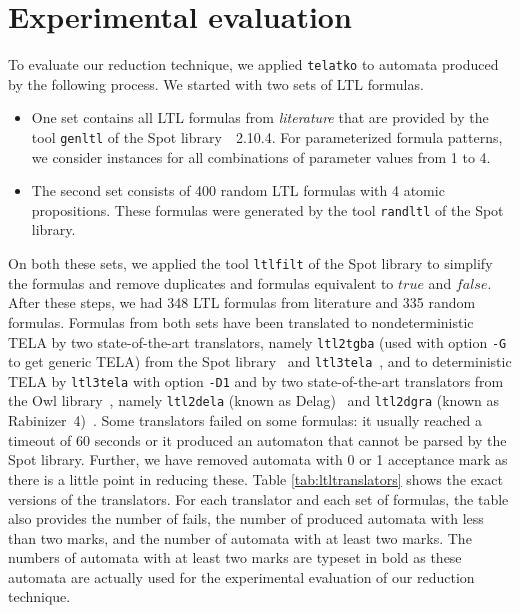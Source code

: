\documentclass[a4paper,UKenglish,cleveref,autoref,thm-restate]{lipics-v2021}
\def\false{\mathit{false}}
\def\true{\mathit{true}}
\newcommand{\telatko}{\texttt{telatko}\xspace}
\begin{document}

\section{Experimental evaluation}\label{sec:experiments}

To evaluate our reduction technique, we applied \telatko to automata
produced by the following process. We started with two sets of LTL formulas.
\begin{itemize}
\item One set contains all LTL formulas from \emph{literature} that
  are provided by the tool \texttt{genltl} of the Spot
  library~\cite{duret.16.atva2}~2.10.4. For parameterized formula
  patterns, we consider instances for all combinations of parameter
  values from 1 to 4.
\item The second set consists of 400 random LTL formulas with 4 atomic
  propositions. These formulas were generated by the tool
  \texttt{randltl} of the Spot library.
\end{itemize}
On both these sets, we applied the tool \texttt{ltlfilt} of the Spot
library to simplify the formulas and remove duplicates and formulas
equivalent to $\true$ and $\false$. After these steps, we had 348
LTL formulas from literature and 335 random formulas.
%
Formulas from both sets have been translated to nondeterministic TELA
by two state-of-the-art translators, namely \texttt{ltl2tgba} (used
with option \texttt{-G} to get generic TELA) from the Spot
library~\cite{duret.16.atva2} and
\texttt{ltl3tela}~\cite{major.19.atva}, and to deterministic TELA by
\texttt{ltl3tela} with option \texttt{-D1} and by two state-of-the-art
translators from the Owl library~\cite{kretinsky.18.atva}, namely
\texttt{ltl2dela} (known as Delag)~\cite{muller.17.gandalf} and
\texttt{ltl2dgra} (known as Rabinizer~4)~\cite{kretinsky.18.cav}. Some
translators failed on some formulas: it usually reached a timeout of
60 seconds or it produced an automaton that cannot be parsed by the
Spot library.
Further, we have removed automata with 0 or 1 acceptance mark as there
is a little point in reducing these. Table \ref{tab:ltltranslators}
shows the exact versions of the translators. For each translator and
each set of formulas, the table also provides the number of fails, the
number of produced automata with less than two marks, and the number
of automata with at least two marks. The numbers of automata with at
least two marks are typeset in bold as these automata are actually
used for the experimental evaluation of our reduction technique.
\end{document}
